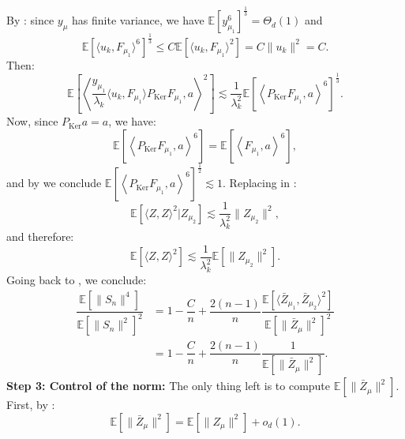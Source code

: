 \documentclass[]{article}
\numberwithin{equation}{section}
\theoremstyle{definition}
\newcommand{\EE}{\mathbb{E}}
\begin{document}
By : since $y_\mu$ has finite variance, we have $\EE[y_{\mu_1}^{6}]^{\frac{1}{3}} = \Theta_{d}(1)$ and 
\begin{equation}
\EE \left [ \langle u_{k}, F_{\mu_1} \rangle^6\right ]^{\frac{1}{3}} \leq C \EE \left [ \langle u_{k}, F_{\mu_1} \rangle^2\right ]= C\| u_k\|^2 = C. 
\label{eq:expectation_projection}
\end{equation}
Then: 
\begin{equation}
     \EE \left [\left \langle \dfrac{y_{\mu_1}}{\lambda_{k}} \langle u_{k}, F_{\mu_1} \rangle P_{\mathrm{Ker}} F_{\mu_1}, a\right \rangle^2\right ] \lesssim \dfrac{1}{\lambda_k^2} \EE \left [ \left \langle P_{\mathrm{Ker}} F_{\mu_1}, a\right \rangle^6 \right ]^{\frac{1}{3}}.
\end{equation}
Now, since $P_{\mathrm{Ker}} a = a$, we have: 
\begin{equation}
    \EE \left [ \left \langle P_{\mathrm{Ker}} F_{\mu_1}, a\right \rangle^6 \right ] = \EE \left [ \left \langle F_{\mu_1}, a\right \rangle^6 \right ],
\end{equation}
and by  we conclude $\EE \left [ \left \langle P_{\mathrm{Ker}} F_{\mu_1}, a\right \rangle^6 \right ]^{\frac{1}{2}} \lesssim 1$. Replacing in :
\begin{equation}
    \EE\left [ \langle Z, Z \rangle^{2} |Z_{\mu_2}\right ] \lesssim  \dfrac{1}{\lambda_k^2}\|Z_{\mu_2}\|^2,
\end{equation}
and therefore: 
\begin{equation}
    \EE\left [ \langle Z, Z \rangle^{2}\right ] \lesssim  \dfrac{1}{\lambda_k^2}\EE \left [ \|Z_{\mu_2}\|^2 \right ].
\end{equation}
Going back to , we conclude: 
\begin{align}
    \dfrac{\EE \left [ \| S_{n} \|^{4}\right ]}{\EE \left [ \|S_{n}\|^2\right ]^2} &= 1-\dfrac{C}{n} + \dfrac{2(n-1)}{n} \dfrac{\EE\left [ \langle \bar{Z}_{\mu_1}, \bar{Z}_{\mu_2} \rangle^{2}\right ]}{\EE \left [\| \bar{Z}_{\mu}\|^2 \right ]^2} \\
    & = 1-\dfrac{C}{n} + \dfrac{2(n-1)}{n} \dfrac{1}{\EE \left [\| \bar{Z}_{\mu}\|^2 \right ]}.
    \label{eq:4_2_moments_part_2}
\end{align}
\textbf{Step 3: Control of the norm: }
The only thing left is to compute $\EE \left [ \| \bar{Z}_\mu\|^2\right ]$. First, by : 
\begin{equation}
    \EE[\|\bar{Z}_\mu\|^{2}] = \EE[\|Z_\mu\|^{2}] + o_{d}(1). 
\end{equation}
\end{document}
